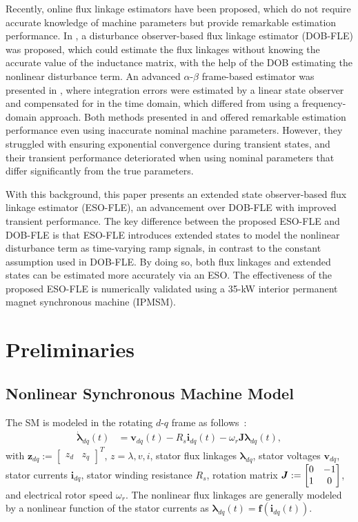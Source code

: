 \documentclass[conference]{IEEEtran}
\begin{document}
Recently, online flux linkage estimators have been proposed, which do not require accurate knowledge of machine parameters but provide remarkable estimation performance. In \cite{b11}, a disturbance observer-based flux linkage estimator (DOB-FLE) was proposed, which could estimate the flux linkages without knowing the accurate value of the inductance matrix, with the help of the DOB estimating the nonlinear disturbance term. An advanced $\alpha$-$\beta$ frame-based estimator was presented in \cite{b12}, where integration errors were estimated by a linear state observer and compensated for in the time domain, which differed from using a frequency-domain approach. Both methods presented in \cite{b11} and \cite{b12} offered remarkable estimation performance even using inaccurate nominal machine parameters. However, they struggled with ensuring exponential convergence during transient states, and their transient performance deteriorated when using nominal parameters that differ significantly from the true parameters.

With this background, this paper presents an extended state observer-based flux linkage estimator (ESO-FLE), an advancement over DOB-FLE with improved transient performance. The key difference between the proposed ESO-FLE and DOB-FLE is that ESO-FLE introduces extended states to model the nonlinear disturbance term as time-varying
ramp signals, in contrast to the constant assumption used in DOB-FLE. By doing so, both flux linkages and extended states can be estimated more accurately via an ESO. The effectiveness of the proposed ESO-FLE is numerically validated using a 35-kW interior permanent magnet synchronous machine (IPMSM). 

\section{Preliminaries}
\subsection{Nonlinear Synchronous Machine Model}
%
The SM is modeled in the rotating $d$-$q$ frame as follows~\cite{b13}:
    \begin{align}\label{eqn:se_dq}
    {\dot{\boldsymbol{{{\lambda}}} }_{dq}(t)} &= {{\boldsymbol{v}}_{dq}(t)} - {{{R}}_{s}} {\boldsymbol{i}}_{dq}(t) -\omega_{r}\boldsymbol{J} { {\boldsymbol{{\lambda}} }_{dq}(t)},
    \end{align}   
 with ${{\boldsymbol{z}}_{dq} :=\begin{bmatrix} {z}_{d} & {z}_{q}\end{bmatrix}^{T}}$, $z = {{{{\lambda}}} }, {{v}},{{i} } $, stator flux linkages ${\boldsymbol{\lambda}}_{dq}$, stator voltages $ {\boldsymbol{v}}_{dq}$, stator currents $ { {\boldsymbol{i}} }_{dq}$, stator winding resistance $R_s$, rotation matrix ${ {\boldsymbol{J}}:=\begin{bmatrix}\notag 0 & -1 \\ 1 & 0 \end{bmatrix} }$, and electrical rotor speed $\omega_r$. The nonlinear flux linkages are generally modeled by a nonlinear function of the stator currents as ${\boldsymbol{\lambda}_{dq}}(t) = \boldsymbol{f}({\boldsymbol{i}_{dq}}(t))$.
\end{document}
